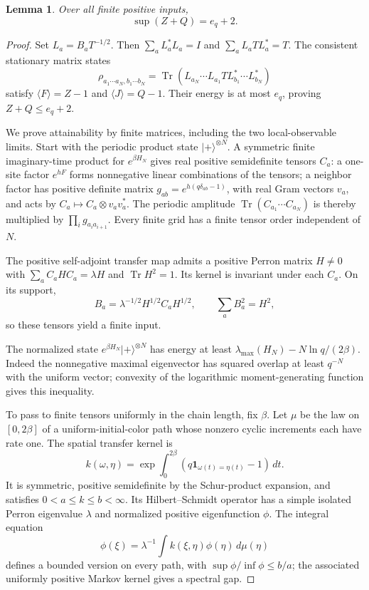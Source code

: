 \documentclass[12pt,letterpaper,onecolumn]{article}
\newtheorem{lemma}[theorem]{Lemma}
\DeclareMathOperator{\Tr}{Tr}
\newcommand{\one}{\mathbf 1}
\begin{document}
\begin{lemma}\label{lem:energy}
Over all finite positive inputs,
\begin{equation}\label{eq:energysup}
\sup(Z+Q)=e_q+2.
\end{equation}
\end{lemma}
\begin{proof}
Set $L_a=B_aT^{-1/2}$. Then $\sum_aL_a^*L_a=I$ and $\sum_aL_aTL_a^*=T$. The consistent stationary matrix states~\cite{fannes}
\[
\rho_{a_1\cdots a_N,b_1\cdots b_N}
=\Tr(L_{a_N}\cdots L_{a_1}T L_{b_1}^*\cdots L_{b_N}^*)
\]
satisfy $\langle F\rangle=Z-1$ and $\langle J\rangle=Q-1$. Their energy is at most $e_q$, proving $Z+Q\le e_q+2$.

We prove attainability by finite matrices, including the two local-observable limits. Start with the periodic product state $|+\rangle^{\otimes N}$. A symmetric finite imaginary-time product for $e^{\beta H_N}$ gives real positive semidefinite tensors $C_a$: a one-site factor $e^{hF}$ forms nonnegative linear combinations of the tensors; a neighbor factor has positive definite matrix $g_{ab}=e^{h(q\delta_{ab}-1)}$, with real Gram vectors $v_a$, and acts by
$C_a\mapsto C_a\otimes v_av_a^*$. The periodic amplitude $\Tr(C_{a_1}\cdots C_{a_N})$ is thereby multiplied by $\prod_i g_{a_i a_{i+1}}$. Every finite grid has a finite tensor order independent of $N$.

The positive self-adjoint transfer map admits a positive Perron matrix $H\ne0$ with $\sum_aC_aHC_a=\lambda H$ and $\Tr H^2=1$. Its kernel is invariant under each $C_a$. On its support,
\begin{equation}\label{eq:canonical}
B_a=\lambda^{-1/2}H^{1/2}C_aH^{1/2},\qquad
\sum_aB_a^2=H^2,
\end{equation}
so these tensors yield a finite input.

The normalized state $e^{\beta H_N}|+\rangle^{\otimes N}$ has energy at least $\lambda_{\max}(H_N)-N\ln q/(2\beta)$. Indeed the nonnegative maximal eigenvector has squared overlap at least $q^{-N}$ with the uniform vector; convexity of the logarithmic moment-generating function gives this inequality.

To pass to finite tensors uniformly in the chain length, fix $\beta$. Let $\mu$ be the law on $[0,2\beta]$ of a uniform-initial-color path whose nonzero cyclic increments each have rate one. The spatial transfer kernel is
\begin{equation}\label{eq:pathkernel}
k(\omega,\eta)=\exp\int_0^{2\beta}
(q\one_{\omega(t)=\eta(t)}-1)\,dt.
\end{equation}
It is symmetric, positive semidefinite by the Schur-product expansion, and satisfies $0<a\le k\le b<\infty$. Its Hilbert--Schmidt operator has a simple isolated Perron eigenvalue $\lambda$ and normalized positive eigenfunction $\phi$. The integral equation
\begin{equation}\label{eq:perronpath}
\phi(\xi)=\lambda^{-1}\int k(\xi,\eta)\phi(\eta)\,d\mu(\eta)
\end{equation}
defines a bounded version on every path, with $\sup\phi/\inf\phi\le b/a$; the associated uniformly positive Markov kernel gives a spectral gap.


\end{proof}
\end{document}
